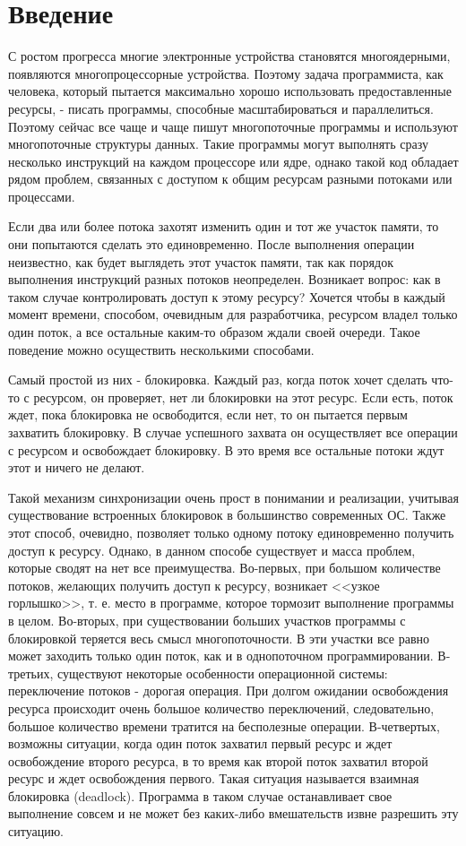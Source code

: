 \documentclass[12pt]{article}
\begin{document}
	{\pagestyle{plain}
		
		\section{Введение}
			\par\large С ростом прогресса многие электронные устройства становятся многоядерными, появляются многопроцессорные устройства. Поэтому задача программиста, как человека, который пытается максимально хорошо использовать предоставленные ресурсы, - писать программы, способные масштабироваться и параллелиться. Поэтому сейчас все чаще и чаще пишут многопоточные программы и используют многопоточные структуры данных. Такие программы могут выполнять сразу несколько инструкций на каждом процессоре или ядре, однако такой код обладает рядом проблем, связанных с доступом к общим ресурсам разными потоками или процессами.
			\par Если два или более потока захотят изменить один и тот же участок памяти, то они попытаются сделать это единовременно. После выполнения операции неизвестно, как будет выглядеть этот участок памяти, так как порядок выполнения инструкций разных потоков неопределен. Возникает вопрос: как в таком случае контролировать доступ к этому ресурсу? Хочется чтобы в каждый момент времени, способом, очевидным для разработчика, ресурсом владел только один поток, а все остальные каким-то образом ждали своей очереди. Такое поведение можно осуществить несколькими способами. 
			\par Самый простой из них - блокировка. Каждый раз, когда поток хочет сделать что-то с ресурсом, он проверяет, нет ли блокировки на этот ресурс. Если есть, поток ждет, пока блокировка не освободится, если нет, то он пытается первым захватить блокировку. В случае успешного захвата он осуществляет все операции с ресурсом и освобождает блокировку. В это время все остальные потоки ждут этот и ничего не делают. 
			\par Такой механизм синхронизации очень прост в понимании и реализации, учитывая существование встроенных блокировок в большинство современных ОС. Также этот способ, очевидно, позволяет только одному потоку единовременно получить доступ к ресурсу. Однако, в данном способе существует и масса проблем, которые сводят на нет все преимущества. Во-первых, при большом количестве потоков, желающих получить доступ к ресурсу, возникает <<узкое горлышко>>, т. е. место в программе, которое тормозит выполнение программы в целом. Во-вторых, при существовании больших участков программы с блокировкой теряется весь смысл многопоточности. В эти участки все равно может заходить только один поток, как и в однопоточном программировании. В-третьих, существуют некоторые особенности операционной системы: переключение потоков - дорогая операция. При долгом ожидании освобождения ресурса происходит очень большое количество переключений, следовательно, большое количество времени тратится на бесполезные операции. В-четвертых, возможны ситуации, когда один поток захватил первый ресурс и ждет освобождение второго ресурса, в то время как второй поток захватил второй ресурс и ждет освобождения первого. Такая ситуация называется взаимная блокировка (deadlock). Программа в таком случае останавливает свое выполнение совсем и не может без каких-либо вмешательств извне разрешить эту ситуацию.
}
\end{document}
